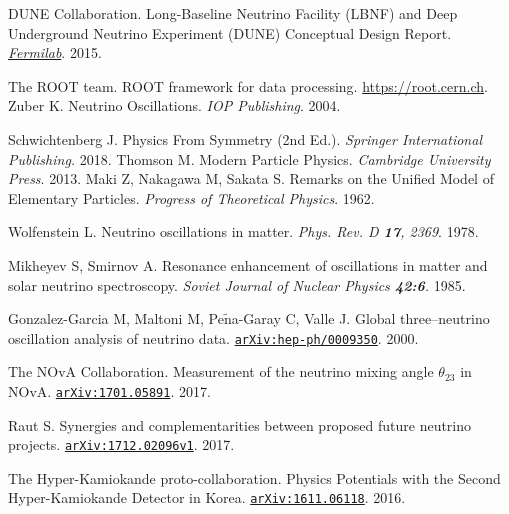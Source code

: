 \begin{thebibliography}{100}

	DUNE Collaboration. Long-Baseline Neutrino Facility (LBNF) and
		Deep Underground Neutrino Experiment (DUNE) Conceptual Design Report.
		\href{https://web.fnal.gov/project/LBNF/ReviewsAndAssessments/LBNF_DUNE\%20DOE\%20CD-1\%20Refresh\%20Review/SitePages/Conceptual\%20Design\%20Report.aspx}{\textit{Fermilab}}.
		2015.
		
	 The ROOT team. ROOT framework for data processing.
		\url{https://root.cern.ch}.
	 Zuber K. Neutrino
		Oscillations. \textit{IOP Publishing}. 2004.

	 Schwichtenberg J. Physics From Symmetry (2nd Ed.).
		\textit{Springer International Publishing.} 2018.
	 Thomson M. Modern Particle Physics. \textit{Cambridge
		University Press}. 2013.
	 Maki Z, Nakagawa M, Sakata S. Remarks on the Unified Model of
		Elementary Particles. \textit{Progress of Theoretical Physics}. 1962.

	 Wolfenstein L. Neutrino oscillations in matter.
		\textit{Phys. Rev. D \textbf{17}, 2369}. 1978.

	 Mikheyev S, Smirnov A. Resonance enhancement of
		oscillations in matter and solar neutrino spectroscopy. \textit{Soviet
		Journal of Nuclear Physics \textbf{42:6}.} 1985.

	 Gonzalez-Garcia M, Maltoni M, Pe$\tilde{\text{n}}$a-Garay C,
		Valle J. Global three–neutrino oscillation analysis of
		neutrino data.
		\href{https://arxiv.org/abs/hep-ph/0009350}{\texttt{arXiv:hep-ph/0009350}}.
		2000.

	 The NOvA Collaboration. Measurement of the neutrino mixing
		angle $\theta_{23}$ in NOvA.
		\href{https://arxiv.org/abs/1701.05891}{\texttt{arXiv:1701.05891}}. 2017.

	 Raut S. Synergies and complementarities between proposed
		future neutrino projects.
		\href{https://arxiv.org/abs/1712.02096v1}{\texttt{arXiv:1712.02096v1}}.
		2017.

	 The Hyper-Kamiokande proto-collaboration. Physics Potentials
		with the Second Hyper-Kamiokande Detector in Korea.
		\href{https://arxiv.org/abs/1611.06118}{\texttt{arXiv:1611.06118}}. 2016.



\end{thebibliography}
